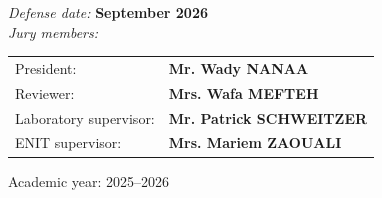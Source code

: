 \begin{titlepage}
\vspace{0.1cm}

\noindent
{\emph{Defense date:}} {\textbf{September 2026}}\\[0.01cm]

{\emph{Jury members:}}\\[0.1cm]

\renewcommand{\arraystretch}{0.86}
\begin{tabular}{@{}ll@{}}
President: & \textbf{Mr. Wady NANAA} \\
Reviewer: & \textbf{Mrs. Wafa MEFTEH} \\
Laboratory supervisor: & \textbf{Mr. Patrick SCHWEITZER} \\
ENIT supervisor: & \textbf{Mrs. Mariem ZAOUALI} \\
\end{tabular}
\begin{center}
Academic year: 2025--2026
\end{center}

\vfill

\end{titlepage}
